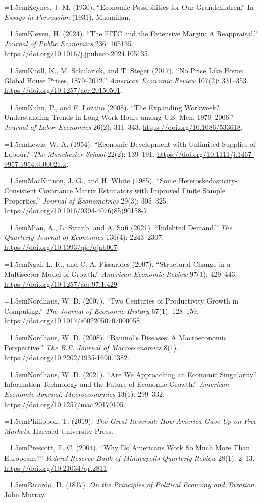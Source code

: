 \documentclass[12pt]{article}
\theoremstyle{plain}
\newcommand{\refentry}[1]{\par\hangindent=1.5em\hangafter=1\noindent #1}
\begin{document}
{\refentry{Keynes, J. M. (1930). ``Economic Possibilities for Our Grandchildren.'' In \emph{Essays in Persuasion} (1931), Macmillan.}
\refentry{Kleven, H. (2024). ``The EITC and the Extensive Margin: A Reappraisal.'' \emph{Journal of Public Economics} 236: 105135. \url{https://doi.org/10.1016/j.jpubeco.2024.105135}.}
\refentry{Knoll, K., M. Schularick, and T. Steger (2017). ``No Price Like Home: Global House Prices, 1870--2012.'' \emph{American Economic Review} 107(2): 331--353. \url{https://doi.org/10.1257/aer.20150501}.}
\refentry{Kuhn, P., and F. Lozano (2008). ``The Expanding Workweek? Understanding Trends in Long Work Hours among U.S. Men, 1979--2006.'' \emph{Journal of Labor Economics} 26(2): 311--343. \url{https://doi.org/10.1086/533618}.}
\refentry{Lewis, W. A. (1954). ``Economic Development with Unlimited Supplies of Labour.'' \emph{The Manchester School} 22(2): 139--191. \url{https://doi.org/10.1111/j.1467-9957.1954.tb00021.x}.}
\refentry{MacKinnon, J. G., and H. White (1985). ``Some Heteroskedasticity-Consistent Covariance Matrix Estimators with Improved Finite Sample Properties.'' \emph{Journal of Econometrics} 29(3): 305--325. \url{https://doi.org/10.1016/0304-4076(85)90158-7}.}
\refentry{Mian, A., L. Straub, and A. Sufi (2021). ``Indebted Demand.'' \emph{The Quarterly Journal of Economics} 136(4): 2243--2307. \url{https://doi.org/10.1093/qje/qjab007}.}
\refentry{Ngai, L. R., and C. A. Pissarides (2007). ``Structural Change in a Multisector Model of Growth.'' \emph{American Economic Review} 97(1): 429--443. \url{https://doi.org/10.1257/aer.97.1.429}.}
\refentry{Nordhaus, W. D. (2007). ``Two Centuries of Productivity Growth in Computing.'' \emph{The Journal of Economic History} 67(1): 128--159. \url{https://doi.org/10.1017/s0022050707000058}.}
\refentry{Nordhaus, W. D. (2008). ``Baumol's Diseases: A Macroeconomic Perspective.'' \emph{The B.E. Journal of Macroeconomics} 8(1). \url{https://doi.org/10.2202/1935-1690.1382}.}
\refentry{Nordhaus, W. D. (2021). ``Are We Approaching an Economic Singularity? Information Technology and the Future of Economic Growth.'' \emph{American Economic Journal: Macroeconomics} 13(1): 299--332. \url{https://doi.org/10.1257/mac.20170105}.}
\refentry{Philippon, T. (2019). \emph{The Great Reversal: How America Gave Up on Free Markets.} Harvard University Press.}
\refentry{Prescott, E. C. (2004). ``Why Do Americans Work So Much More Than Europeans?'' \emph{Federal Reserve Bank of Minneapolis Quarterly Review} 28(1): 2--13. \url{https://doi.org/10.21034/qr.2811}.}
\refentry{Ricardo, D. (1817). \emph{On the Principles of Political Economy and Taxation.} John Murray.}
}
\end{document}
